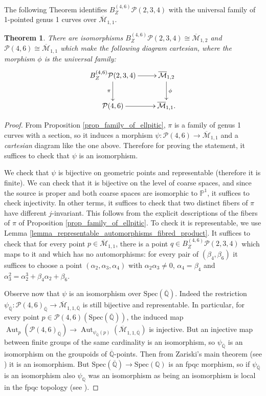 \documentclass[11pt]{amsart}
\newtheorem{theorem}{Theorem}[section]
\theoremstyle{definition}
\theoremstyle{remark}
\newcommand{\bP}{{\mathbb P}}
\newcommand{\bQ}{{\mathbb Q}}
\newcommand{\calM}{\mathcal M}
\newcommand{\calP}{\mathcal P}
\newcommand{\Spec}{\mathrm{Spec}}
\begin{document}
 The following Theorem identifies $B_Z^{(4,6)}\calP(2,3,4)$ with the universal family of 1-pointed genus 1 curves over $\overline{\calM}_{1,1}$.
\begin{theorem}\label{theorem_iso_weighted_blowup_M12}
There are isomorphisms $B_Z^{(4,6)}\calP(2,3,4) \cong \overline{\calM}_{1,2}$ and $\calP(4,6) \cong \overline{\calM}_{1,1}$ which make the following diagram cartesian, where the morphism $\phi$ is the universal family:
$$\xymatrix{B_Z^{(4,6)}\calP(2,3,4) \ar[d]_{\pi}\ar[r] &\overline{\calM}_{1,2} \ar[d]^{\phi}\\ \calP(4,6) \ar[r] &  \overline{\calM}_{1,1}.}$$
\end{theorem}
\begin{proof}
From Proposition \ref{prop_family_of_ellpitic}, $\pi$ is a family of genus 1 curves with a section, so it induces a morphism $\psi:\calP(4,6) \to \overline{\calM}_{1,1}$ and a \emph{cartesian} diagram like the one above. Therefore for proving the statement, it suffices to check that $\psi$ is an isomorphism.





We check that $\psi$ is bijective on geometric points and representable (therefore it is finite). 
 We can check that it is bijective on the level of coarse spaces, and since the source is proper and both coarse spaces are isomorphic to $\bP^1$, it suffices to check injectivity.
In other terms, it suffices to check that two distinct fibers of $\pi$ have different $j$-invariant. This follows from the explicit descriptions of the fibers of $\pi$ of Proposition \ref{prop_family_of_ellpitic}.
To check it is representable, we use Lemma \ref{lemma_representable_automorphisms_fibred_product}. It suffices to check that for every point $p\in \overline{\calM}_{1,1}$, there is a point $q \in B_Z^{(4,6)}\calP(2,3,4)$ which maps to it and which has no automorphisms: for every pair of $(\beta_4,\beta_6)$ it suffices to choose a point $(\alpha_2,\alpha_3,\alpha_4)$ with $\alpha_2\alpha_3 \neq 0$, $\alpha_4 = \beta_4$ and $\alpha_3^2 = \alpha_2^3 + \beta_4\alpha_2 +\beta_6$.

Observe now that $\psi$ is an isomorphism over $\Spec(\overline{\mathbb{Q}})$. Indeed the restriction $\psi_{\overline{\mathbb{Q}}} : \calP(4,6)_{\overline{\mathbb{Q}}} \to \overline{\calM}_{1,1, \overline{\mathbb{Q}}}$ is still bijective and representable. In particular, for every point $p\in \calP(4,6)(\Spec(\overline{\bQ}))$, the induced map $\operatorname{Aut}_p(\calP(4,6)_{\overline{\mathbb{Q}}})\to \operatorname{Aut}_{\psi_{\overline{\bQ}}(p)}(\overline{\calM}_{1,1,\overline{\mathbb{Q}}})$ is injective. But an injective map between finite groups of the same cardinality is an isomorphism,
so $\psi_{\overline{\bQ}}$ is an isomorphism on the groupoids of $\overline{\mathbb{Q}}$-points. Then from Zariski's main theorem (see \cite[Theorem A.5]{AI19}) it is an isomorphism. But $\Spec(\overline{\mathbb{Q}})\to \Spec(\bQ)$ is an fpqc morphism, so if $\psi_{\overline{\mathbb{Q}}}$ is an isomorphism also $\psi_{\bQ}$ was an isomorphism as being an isomorphism is local in the fpqc topology (see \cite[\href{https://stacks.math.columbia.edu/tag/02YJ}{Tag 02YJ}]{stacks-project}).


\end{proof}
\end{document}
